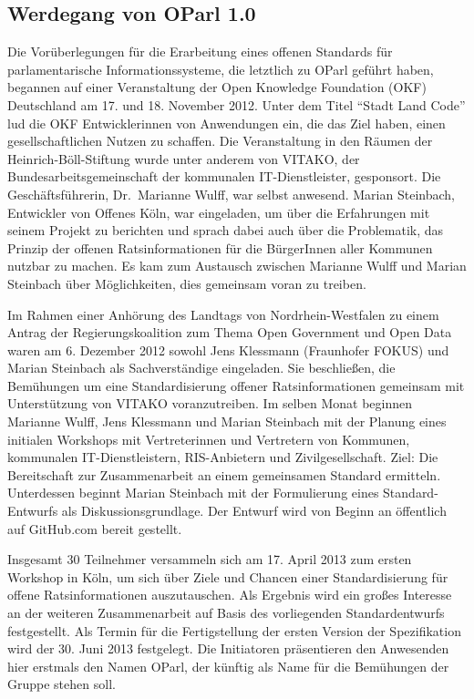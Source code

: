 \documentclass[,a4paper]{article}
\begin{document}
\subsection{Werdegang von OParl 1.0}\label{werdegang-von-oparl-1.0}

Die Vorüberlegungen für die Erarbeitung eines offenen Standards für
parlamentarische Informationssysteme, die letztlich zu OParl geführt
haben, begannen auf einer Veranstaltung der Open Knowledge Foundation
(OKF) Deutschland am 17. und 18. November 2012. Unter dem Titel ``Stadt
Land Code'' lud die OKF Entwicklerinnen von Anwendungen ein, die das
Ziel haben, einen gesellschaftlichen Nutzen zu schaffen. Die
Veranstaltung in den Räumen der Heinrich-Böll-Stiftung wurde unter
anderem von VITAKO, der Bundesarbeitsgemeinschaft der kommunalen
IT-Dienstleister, gesponsort. Die Geschäftsführerin, Dr.~Marianne Wulff,
war selbst anwesend. Marian Steinbach, Entwickler von Offenes Köln, war
eingeladen, um über die Erfahrungen mit seinem Projekt zu berichten und
sprach dabei auch über die Problematik, das Prinzip der offenen
Ratsinformationen für die BürgerInnen aller Kommunen nutzbar zu machen.
Es kam zum Austausch zwischen Marianne Wulff und Marian Steinbach über
Möglichkeiten, dies gemeinsam voran zu treiben.

Im Rahmen einer Anhörung des Landtags von Nordrhein-Westfalen zu einem
Antrag der Regierungskoalition zum Thema Open Government und Open Data
waren am 6. Dezember 2012 sowohl Jens Klessmann (Fraunhofer FOKUS) und
Marian Steinbach als Sachverständige eingeladen. Sie beschließen, die
Bemühungen um eine Standardisierung offener Ratsinformationen gemeinsam
mit Unterstützung von VITAKO voranzutreiben. Im selben Monat beginnen
Marianne Wulff, Jens Klessmann und Marian Steinbach mit der Planung
eines initialen Workshops mit Vertreterinnen und Vertretern von
Kommunen, kommunalen IT-Dienstleistern, RIS-Anbietern und
Zivilgesellschaft. Ziel: Die Bereitschaft zur Zusammenarbeit an einem
gemeinsamen Standard ermitteln. Unterdessen beginnt Marian Steinbach mit
der Formulierung eines Standard-Entwurfs als Diskussionsgrundlage. Der
Entwurf wird von Beginn an öffentlich auf GitHub.com bereit gestellt.

Insgesamt 30 Teilnehmer versammeln sich am 17. April 2013 zum ersten
Workshop in Köln, um sich über Ziele und Chancen einer Standardisierung
für offene Ratsinformationen auszutauschen. Als Ergebnis wird ein großes
Interesse an der weiteren Zusammenarbeit auf Basis des vorliegenden
Standardentwurfs festgestellt. Als Termin für die Fertigstellung der
ersten Version der Spezifikation wird der 30. Juni 2013 festgelegt. Die
Initiatoren präsentieren den Anwesenden hier erstmals den Namen OParl,
der künftig als Name für die Bemühungen der Gruppe stehen soll.
\end{document}
